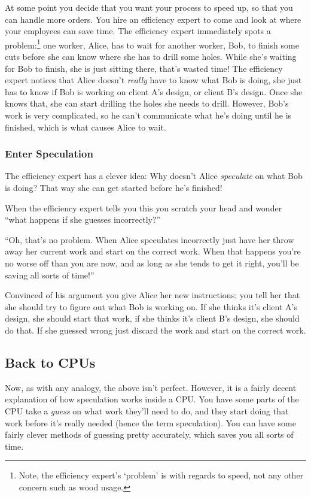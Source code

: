 \documentclass{article}
\begin{document}
At some point you decide that you want your process to speed up, so that you
can handle more orders. You hire an efficiency expert to come and look at
where your employees can save time. The efficiency expert immediately spots a
problem:\footnote{Note, the efficiency expert's `problem' is with regards to
speed, not any other concern such as wood usage.} one worker, Alice, has to
wait for another worker, Bob, to finish some cuts before she can know where
she has to drill some holes. While she's waiting for Bob to finish, she is
just sitting there, that's wasted time!  The efficiency expert notices that
Alice doesn't \emph{really} have to know what Bob is doing, she just has to
know if Bob is working on client A's design, or client B's design. Once she
knows that, she can start drilling the holes she needs to drill. However,
Bob's work is very complicated, so he can't communicate what he's doing until
he is finished, which is what causes Alice to wait.

\subsubsection*{Enter Speculation}

The efficiency expert has a clever idea: Why doesn't Alice \emph{speculate}
on what Bob is doing? That way she can get started before he's finished!

When the efficiency expert tells you this you scratch your head and wonder
``what happens if she guesses incorrectly?''

``Oh, that's no problem. When Alice speculates incorrectly just have her throw
away her current work and start on the correct work. When that happens you're
no worse off than you are now, and as long as she tends to get it right, you'll
be saving all sorts of time!''

Convinced of his argument you give Alice her new instructions; you tell her
that she should try to figure out what Bob is working on. If she thinks it's
client A's design, she should start that work, if she thinks it's client B's
design, she should do that. If she guessed wrong just discard the work and
start on the correct work.


\subsection*{Back to CPUs}

Now, as with any analogy, the above isn't perfect. However, it is a fairly
decent explanation of how speculation works inside a CPU. You have some parts
of the CPU take a \emph{guess} on what work they'll need to do, and they start
doing that work before it's really needed (hence the term speculation). You can
have some fairly clever methods of guessing pretty accurately, which saves you
all sorts of time.
\end{document}
